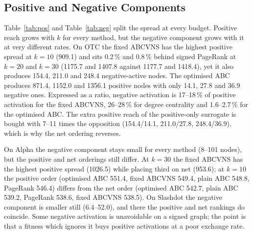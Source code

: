 \documentclass[journal,letterpaper,10pt]{IEEEtran}
\begin{document}
\subsection{Positive and Negative Components}

Table~\ref{tab:pos} and Table~\ref{tab:neg} split the spread at every budget. Positive reach grows with $k$ for every method, but the negative component grows with it at very different rates. On OTC the fixed ABCVNS has the highest positive spread at $k=10$ (909.1) and sits 0.2\,\% and 0.8\,\% behind signed PageRank at $k=20$ and $k=30$ (1175.7 and 1407.8 against 1177.7 and 1418.4), yet it also produces 154.4, 211.0 and 248.4 negative-active nodes. The optimised ABC produces 871.4, 1152.0 and 1356.1 positive nodes with only 14.1, 27.8 and 36.9 negative ones. Expressed as a ratio, negative activation is 17--18\,\% of positive activation for the fixed ABCVNS, 26--28\,\% for degree centrality and 1.6--2.7\,\% for the optimised ABC. The extra positive reach of the positive-only surrogate is bought with 7--11 times the opposition (154.4/14.1, 211.0/27.8, 248.4/36.9), which is why the net ordering reverses.

On Alpha the negative component stays small for every method (8--101 nodes), but the positive and net orderings still differ. At $k=30$ the fixed ABCVNS has the highest positive spread (1026.5) while placing third on net (953.6); at $k=10$ the positive order (optimised ABC 551.4, fixed ABCVNS 549.4, plain ABC 548.8, PageRank 546.4) differs from the net order (optimised ABC 542.7, plain ABC 539.2, PageRank 538.6, fixed ABCVNS 538.5). On Slashdot the negative component is smaller still (6.4--52.0), and there the positive and net rankings do coincide. Some negative activation is unavoidable on a signed graph; the point is that a fitness which ignores it buys positive activations at a poor exchange rate.
\end{document}
